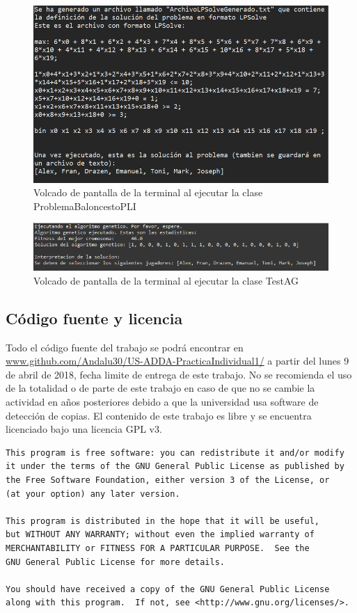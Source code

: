 \documentclass[a4paper,12pt]{article}
\begin{document}
\begin{figure}[H]
  \centering
  \includegraphics{AlgoritmoPLI.PNG}
  \caption{Volcado de pantalla de la terminal al ejecutar la clase ProblemaBaloncestoPLI}
  \label{fig:pli}
\end{figure}

\begin{figure}[H]
  \centering
  \includegraphics[scale=0.75]{TestAG.PNG}
  \caption{Volcado de pantalla de la terminal al ejecutar la clase TestAG}
  \label{fig:ag}
\end{figure}

\subsection{Código fuente y licencia}
Todo el código fuente del trabajo se podrá encontrar en \url{www.github.com/Andalu30/US-ADDA-PracticaIndividual1/}
a partir del lunes 9 de abril de 2018, fecha limite de entrega de este trabajo.
No se recomienda el uso de la totalidad o de parte de este trabajo en caso de que no se cambie la actividad en años posteriores debido a que la universidad usa software de detección de copias.
El contenido de este trabajo es libre y se encuentra licenciado bajo una licencia GPL v3.\\

\begin{verbatim}
This program is free software: you can redistribute it and/or modify
it under the terms of the GNU General Public License as published by
the Free Software Foundation, either version 3 of the License, or
(at your option) any later version.

This program is distributed in the hope that it will be useful,
but WITHOUT ANY WARRANTY; without even the implied warranty of
MERCHANTABILITY or FITNESS FOR A PARTICULAR PURPOSE.  See the
GNU General Public License for more details.

You should have received a copy of the GNU General Public License
along with this program.  If not, see <http://www.gnu.org/licenses/>.

\end{verbatim}
\end{document}
